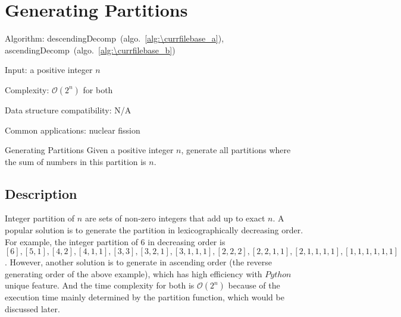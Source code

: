 \documentclass[catalog.tex]{subfiles}
\begin{document}
\def\pbname{Generating Partitions} %

\section{\pbname} 

\begin{overview}
\item [Algorithm:] descendingDecomp~(algo.~\ref{alg:\currfilebase_a}), ascendingDecomp~(algo.~\ref{alg:\currfilebase_b})
\item [Input:] a positive integer $n$
\item [Complexity:]  $\mathcal{O}(2^n)$ for both
\item [Data structure compatibility:] N/A
\item [Common applications:] nuclear fission 
\end{overview}


\begin{problem}{\pbname}
	Given a positive integer $n$, generate all partitions where the sum of numbers in this partition is $n$.
\end{problem}


\subsection*{Description}
Integer partition of $n$ are sets of non-zero integers that add up to exact $n$. A popular solution is to generate the partition in lexicographically decreasing order. For example, the integer partition of $6$ in decreasing order is $[6],[5,1],[4,2],[4,1,1],[3,3],[3,2,1],[3,1,1,1],[2,2,2],[2,2,1,1],[2,1,1,1,1],[1,1,1,1,1,1]$. However, another solution is to generate in ascending order (the reverse generating order of the above example), which has high efficiency with $Python$ unique feature. And the time complexity for both is $\mathcal{O}(2^n)$ because of the execution time mainly determined by the partition function, which would be discussed later.
\end{document}
